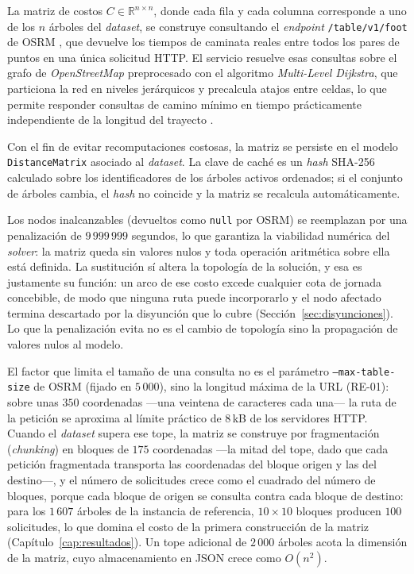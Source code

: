 La matriz de costos $C \in \mathbb{R}^{n \times n}$, donde cada fila y cada columna corresponde a
uno de los $n$ árboles del \textit{dataset}, se construye consultando el \textit{endpoint}
\texttt{/table/v1/foot} de OSRM \citep{osrm}, que devuelve los tiempos de caminata reales entre
todos los pares de puntos en una única solicitud HTTP. El servicio resuelve esas consultas sobre el
grafo de \textit{OpenStreetMap} preprocesado con el algoritmo \textit{Multi-Level Dijkstra}, que
particiona la red en niveles jerárquicos y precalcula atajos entre celdas, lo que permite responder
consultas de camino mínimo en tiempo prácticamente independiente de la longitud del trayecto
\citep{delling2017customizable}.

Con el fin de evitar recomputaciones costosas, la matriz se persiste en el modelo
\texttt{DistanceMatrix} asociado al \textit{dataset}. La clave de caché es un \textit{hash} SHA-256
\citep{sha256} calculado sobre los identificadores de los árboles activos ordenados; si el conjunto
de árboles cambia, el \textit{hash} no coincide y la matriz se recalcula automáticamente.

Los nodos inalcanzables (devueltos como \texttt{null} por OSRM) se reemplazan por una penalización
de $9\,999\,999$ segundos, lo que garantiza la viabilidad numérica del \textit{solver}: la matriz
queda sin valores nulos y toda operación aritmética sobre ella está definida. La sustitución sí
altera la topología de la solución, y esa es justamente su función: un arco de ese costo excede
cualquier cota de jornada concebible, de modo que ninguna ruta puede incorporarlo y el nodo afectado
termina descartado por la disyunción que lo cubre (Sección~\ref{sec:disyunciones}). Lo que la
penalización evita no es el cambio de topología sino la propagación de valores nulos al modelo.

El factor que limita el tamaño de una consulta no es el parámetro \texttt{--max-table-size} de OSRM
(fijado en $5\,000$), sino la longitud máxima de la URL (RE-01): sobre unas $350$ coordenadas
---una veintena de caracteres cada una--- la ruta de la petición se aproxima al límite práctico de
$8$\,kB de los servidores HTTP. Cuando el \textit{dataset} supera ese tope, la matriz se construye
por fragmentación (\textit{chunking}) en bloques de $175$ coordenadas ---la mitad del tope, dado
que cada petición fragmentada transporta las coordenadas del bloque origen y las del destino---, y
el número de solicitudes crece como el cuadrado del número de bloques, porque cada bloque de origen
se consulta contra cada bloque de destino: para los $1\,607$ árboles de la instancia de referencia,
$10 \times 10$ bloques producen $100$ solicitudes, lo que domina el costo de la primera
construcción de la matriz (Capítulo~\ref{cap:resultados}). Un tope adicional de $2\,000$ árboles
acota la dimensión de la matriz, cuyo almacenamiento en JSON crece como $O(n^2)$.

